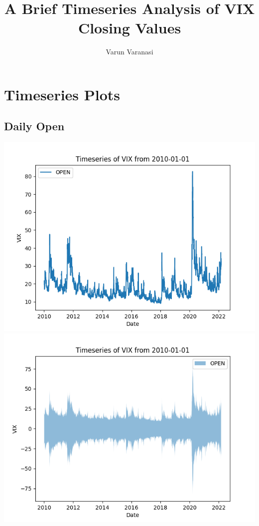 \documentclass{article}
\title{A Brief Timeseries Analysis of VIX Closing Values}
\author{Varun Varanasi}
\begin{document}
\maketitle
\tableofcontents
\newpage

\section{Timeseries Plots}

\subsection{Daily Open}
\begin{center}
    \includegraphics{VIX_Open_Timeseries_2010}
    \includegraphics{VIX_Open_Timeseries_Fill_2010.png}
\end{center}
\end{document}
